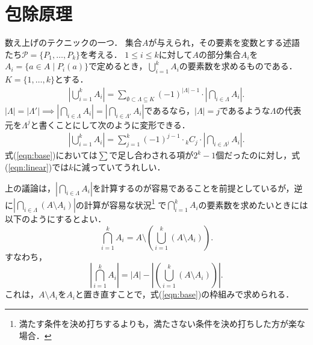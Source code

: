\documentclass{jsarticle}
\begin{document}
\section{包除原理}

数え上げのテクニックの一つ．
集合$A$が与えられ，その要素を変数とする述語たち$\mathcal{P}=\{P_1, \dots, P_k\}$を考える．
$1\le i\le k$に対して$A$の部分集合$A_i$を$A_i=\{a\in A\mid P_i(a)\}$で定めるとき，$\bigcup_{i=1}^k A_i$の要素数を求めるものである．
$K=\{1, \dots, k\}$とする．
\begin{align}\label{eqn:base}
\left|\bigcup_{i=1}^k A_i\right|
= \sum_{\emptyset\subset\Lambda\subseteq K} (-1)^{|\Lambda|-1}\cdot \left|\bigcap_{i\in\Lambda} A_i\right|.
\end{align}
$|\Lambda|=|\Lambda'|\implies\left|\bigcap_{i\in\Lambda}A_i\right| = \left|\bigcap_{i\in\Lambda'}A_i\right|$であるなら，$|\Lambda|=j$であるような$\Lambda$の代表元を$\Lambda^j$と書くことにして次のように変形できる．
\begin{align}\label{eqn:linear}
  \left|\bigcup_{i=1}^k A_i\right|
  = \sum_{j=1}^k (-1)^{j-1}\cdot {}_k C_j\cdot\left|\bigcap_{i\in\Lambda^j}A_i\right|.
\end{align}
式(\ref{eqn:base})においては$\sum$で足し合わされる項が$2^k-1$個だったのに対し，式(\ref{eqn:linear})では$k$に減っていてうれしい．

上の議論は，$\left|\bigcap_{i\in\Lambda}A_i\right|$を計算するのが容易であることを前提としているが，逆に$\left|\bigcap_{i\in\Lambda}(A\setminus A_i)\right|$の計算が容易な状況\footnote{満たす条件を決め打ちするよりも，満たさない条件を決め打ちした方が楽な場合．}
で$\bigcap_{i=1}^k A_i$の要素数を求めたいときには以下のようにするとよい．
\[
\bigcap_{i=1}^k A_i = A\setminus\left(\bigcup_{i=1}^k (A\setminus A_i)\right).
\]
すなわち，
\[
\left|\bigcap_{i=1}^k A_i\right| = |A|-\left|\left(\bigcup_{i=1}^k (A\setminus A_i)\right)\right|.
\]
これは，$A\setminus A_i$を$A_i$と置き直すことで，式(\ref{eqn:base})の枠組みで求められる．
\end{document}
